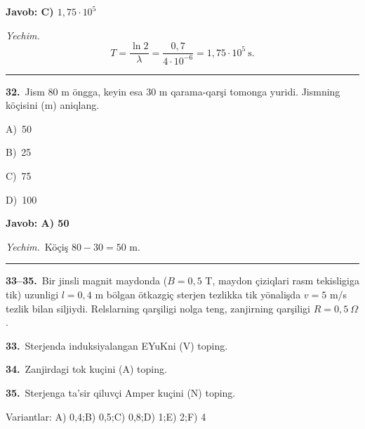 \documentclass[11pt,a4paper]{article}
\newcommand{\opt}[2]{\hspace*{4mm}#1)\ #2\par}
\begin{document}
\noindent\colorbox{gray!12}{\parbox{\dimexpr\linewidth-2\fboxsep}{\textbf{Javob: C) $1{,}75\cdot10^5$}}}\par\smallskip
\noindent\textit{Yechim.}\ \[T=\frac{\ln2}{\lambda}=\frac{0{,}7}{4\cdot10^{-6}}=1{,}75\cdot10^5\ \text{s}.\]\par\medskip\hrule\medskip
{}\noindent\begin{minipage}{\linewidth}
\textbf{32.}\ Jism 80 m öngga, keyin esa 30 m qarama-qarşi tomonga yuridi. Jismning köçisini (m) aniqlang.\par\smallskip
\opt{A}{50}
\opt{B}{25}
\opt{C}{75}
\opt{D}{100}
\end{minipage}\vspace{2pt}\par
\noindent\colorbox{gray!12}{\parbox{\dimexpr\linewidth-2\fboxsep}{\textbf{Javob: A) 50}}}\par\smallskip
\noindent\textit{Yechim.}\ Köçiş $80-30=50$ m.\par\par\medskip\hrule\medskip
\newpage\noindent\textbf{33–35.}\ Bir jinsli magnit maydonda ($B=0,5$ T, maydon çiziqlari rasm tekisligiga tik) uzunligi $l=0,4$ m bölgan ötkazgiç sterjen tezlikka tik yönalişda $v=5$ m/s tezlik bilan siljiydi. Relslarning qarşiligi nolga teng, zanjirning qarşiligi $R=0,5\ \Omega$.\par\medskip
\begin{center}\end{center}
\noindent\textbf{33.}\ Sterjenda induksiyalangan EYuKni (V) toping.\par
\noindent\textbf{34.}\ Zanjirdagi tok kuçini (A) toping.\par
\noindent\textbf{35.}\ Sterjenga ta’sir qiluvçi Amper kuçini (N) toping.\par
\noindent Variantlar: A) 0,4;\quad B) 0,5;\quad C) 0,8;\quad D) 1;\quad E) 2;\quad F) 4\par\smallskip
\end{document}
